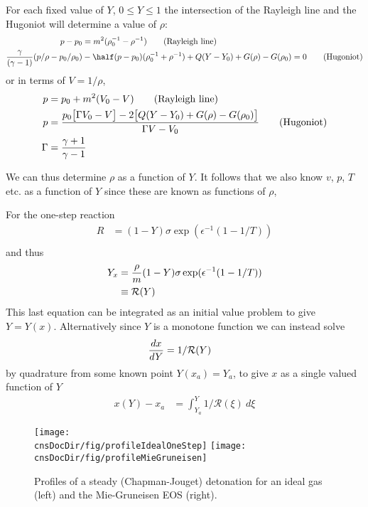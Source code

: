 \documentclass{article}
\newcommand{\cnsDocDir}{../cns}
\begin{document}
\newcommand{\vf}{V} %

For each fixed value of $Y$, $0 \le Y \le 1$ the intersection of the Rayleigh line and the Hugoniot
will determine a value of $\rho$:
\begin{align*}
   p - p_0 &= m^2 ( \rho_0^{-1} - \rho^{-1} ) \qquad\mbox{(Rayleigh line)} \\
  {\gamma\over (\gamma-1)} (p/\rho - p_0/\rho_0 ) & -\half(p - p_0)( \rho_0^{-1} + \rho^{-1} ) 
           + Q(Y-Y_0) + G(\rho)-G(\rho_0) =0 \qquad\mbox{(Hugoniot)}
\end{align*}
or in terms of $\vf=1/\rho$, 
\begin{align*}
   p &= p_0 + m^2 ( \vf_0 - \vf ) \qquad\mbox{(Rayleigh line)} \\
   p &= { p_0 \big[ \Gamma \vf_0 - \vf \big] - 2\big[ Q(Y-Y_0) + G(\rho)-G(\rho_0) \big] \over
                 \Gamma\vf -\vf_0 }  \qquad\mbox{(Hugoniot)} \\
  \Gamma &= {\gamma+1 \over \gamma -1} 
\end{align*}

We can thus determine $\rho$ as a function of $Y$. It follows that we also know $v$, $p$, $T$ etc. as a function
of $Y$ since these are known as functions of $\rho$,

For the one-step reaction
\begin{align*}
   R &= (1-Y)\sigma \exp(\epsilon^{-1}(1-1/T)) \\
\end{align*}
and thus
\begin{align*}
  Y_x &= {\rho\over m} (1-Y)\sigma \exp(\epsilon^{-1}(1-1/T)) \\
      &\equiv {\mathcal R}(Y)
\end{align*}
This last equation can be integrated as an initial value problem 
to give $Y=Y(x)$. Alternatively since $Y$ is a monotone function 
we can instead solve
\begin{align*}
  {d x \over d Y} & = 1/{\mathcal R}(Y)
\end{align*}
by quadrature from some known point $Y(x_a)=Y_a$, to give $x$ as a single valued function
of $Y$
\begin{align*}
   x(Y) - x_a &= \int_{Y_a}^Y 1/{\mathcal R}(\xi) ~d\xi
\end{align*}

\begin{figure}[hbt]
 \begin{center}
   \texttt{[image: \\cnsDocDir/fig/profileIdealOneStep]}
   \texttt{[image: \\cnsDocDir/fig/profileMieGruneisen]}
 \end{center}
\caption{Profiles of a steady (Chapman-Jouget) detonation for an ideal gas (left) and
   the Mie-Gruneisen EOS (right). } \label{fig:detonationCJ}
\end{figure}
\end{document}
